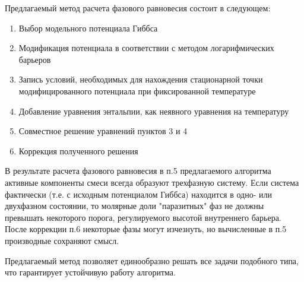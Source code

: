 \documentclass[12pt]{article}
\begin{document}
Предлагаемый метод расчета фазового равновесия состоит в следующем:
\begin{enumerate}
    \item Выбор модельного потенциала Гиббса
    \item Модификация потенциала в соответствии с методом логарифмических барьеров
    \item Запись условий, необходимых для нахождения стационарной точки модифицированного потенциала при фиксированной температуре
    \item Добавление уравнения энтальпии, как неявного уравнения на температуру
    \item Совместное решение уравнений пунктов 3 и 4
    \item Коррекция полученного решения
\end{enumerate}

В результате расчета фазового равновесия в п.5 предлагаемого алгоритма активные компоненты смеси всегда образуют трехфазную систему. Если система фактически (т.е. с исходным потенциалом Гиббса) находится в одно- или двухфазном состоянии, то молярные доли "паразитных" фаз не должны превышать некоторого порога, регулируемого высотой внутреннего барьера. После коррекции п.6 некоторые фазы могут изчезнуть, но вычисленные в п.5 производные сохраняют смысл.

Предлагаемый метод позволяет единообразно решать все задачи подобного типа, что гарантирует устойчивую работу алгоритма.
\end{document}
